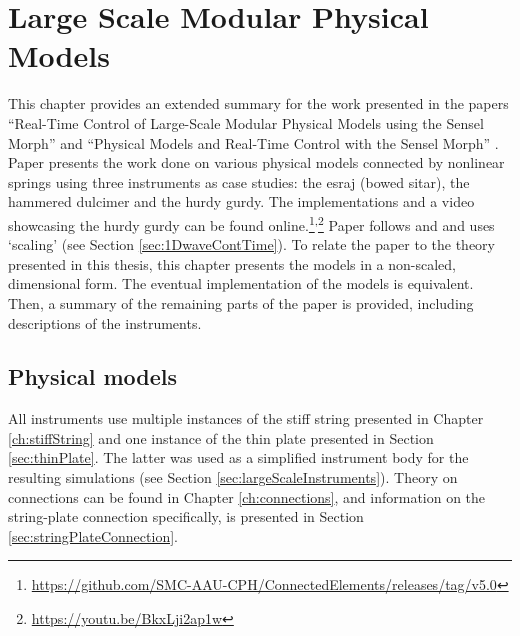 \chapter{Large Scale Modular Physical Models}\label{ch:largeScale}
This chapter provides an extended summary for the work presented in the papers ``Real-Time Control of Large-Scale Modular Physical Models using the Sensel Morph'' \citeP[A] and ``Physical Models and Real-Time Control with the Sensel Morph'' \citeP[B].  Paper \citeP[A] presents the work done on various physical models connected by nonlinear springs using three instruments as case studies: the esraj (bowed sitar), the hammered dulcimer and the hurdy gurdy. The implementations and a video showcasing the hurdy gurdy can be found online.\footnote{\url{https://github.com/SMC-AAU-CPH/ConnectedElements/releases/tag/v5.0}}\textsuperscript{,}\footnote{\url{https://youtu.be/BkxLji2ap1w}} Paper \citeP[A] follows \cite{theBible} and \cite{Bilbao2009Modular} and uses `scaling' (see Section \ref{sec:1DwaveContTime}). To relate the paper to the theory presented in this thesis, this chapter presents the models in a non-scaled, dimensional form. The eventual implementation of the models is equivalent. Then, a summary of the remaining parts of the paper is provided, including descriptions of the instruments.

\section{Physical models}\label{sec:modelsLargeScale}
All instruments use multiple instances of the stiff string presented in Chapter \ref{ch:stiffString} and one instance of the thin plate presented in Section \ref{sec:thinPlate}. The latter was used as a simplified instrument body for the resulting simulations (see Section \ref{sec:largeScaleInstruments}). Theory on connections can be found in Chapter \ref{ch:connections}, and information on the string-plate connection specifically, is presented in Section \ref{sec:stringPlateConnection}.

